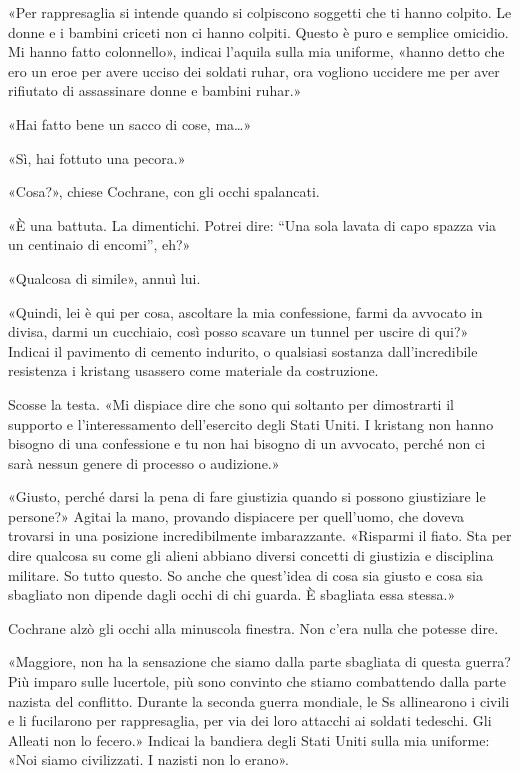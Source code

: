 «Per rappresaglia si intende quando si colpiscono soggetti che ti hanno
colpito. Le donne e i bambini criceti non ci hanno colpiti. Questo è
puro e semplice omicidio. Mi hanno fatto colonnello», indicai l'aquila
sulla mia uniforme, «hanno detto che ero un eroe per avere ucciso dei
soldati ruhar, ora vogliono uccidere me per aver rifiutato di
assassinare donne e bambini ruhar.»

«Hai fatto bene un sacco di cose, ma\ldots»

«Sì, hai fottuto una pecora.»

«Cosa?», chiese Cochrane, con gli occhi spalancati.

«È una battuta. La dimentichi. Potrei dire: ``Una sola lavata di capo
spazza via un centinaio di encomi'', eh?»

«Qualcosa di simile», annuì lui.

«Quindi, lei è qui per cosa, ascoltare la mia confessione, farmi da
avvocato in divisa, darmi un cucchiaio, così posso scavare un tunnel per
uscire di qui?» Indicai il pavimento di cemento indurito, o qualsiasi
sostanza dall'incredibile resistenza i kristang usassero come materiale
da costruzione.

Scosse la testa. «Mi dispiace dire che sono qui soltanto per dimostrarti
il supporto e l'interessamento dell'esercito degli Stati Uniti. I
kristang non hanno bisogno di una confessione e tu non hai bisogno di un
avvocato, perché non ci sarà nessun genere di processo o audizione.»

«Giusto, perché darsi la pena di fare giustizia quando si possono
giustiziare le persone?» Agitai la mano, provando dispiacere per
quell'uomo, che doveva trovarsi in una posizione incredibilmente
imbarazzante. «Risparmi il fiato. Sta per dire qualcosa su come gli
alieni abbiano diversi concetti di giustizia e disciplina militare. So
tutto questo. So anche che quest'idea di cosa sia giusto e cosa sia
sbagliato non dipende dagli occhi di chi guarda. È sbagliata essa
stessa.»

Cochrane alzò gli occhi alla minuscola finestra. Non c'era nulla che
potesse dire.

«Maggiore, non ha la sensazione che siamo dalla parte sbagliata di
questa guerra? Più imparo sulle lucertole, più sono convinto che stiamo
combattendo dalla parte nazista del conflitto. Durante la seconda guerra
mondiale, le Ss allinearono i civili e li fucilarono per rappresaglia,
per via dei loro attacchi ai soldati tedeschi. Gli Alleati non lo
fecero.» Indicai la bandiera degli Stati Uniti sulla mia uniforme: «Noi
siamo civilizzati. I nazisti non lo erano».

